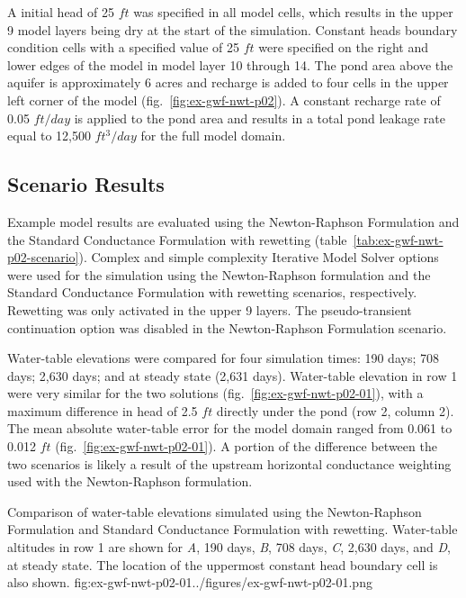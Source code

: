 A initial head of 25 $ft$ was specified in all model cells, which results in the upper 9 model layers being dry at the start of the simulation. Constant heads boundary condition cells with a specified value of 25 $ft$ were specified on the right and lower edges of the model in model layer 10 through 14. The pond area above the aquifer is approximately 6 acres and recharge is added to four cells in the upper left corner of the model (fig.~\ref{fig:ex-gwf-nwt-p02}). A constant recharge rate of 0.05 $ft/day$ is applied to the pond area and results in a total pond leakage rate equal to 12,500 $ft^3/day$ for the full model domain.


\subsection{Scenario Results}

Example model results are evaluated using the Newton-Raphson Formulation and the Standard Conductance Formulation with rewetting (table~\ref{tab:ex-gwf-nwt-p02-scenario}). Complex and simple complexity Iterative Model Solver options were used for the simulation using the Newton-Raphson formulation and the Standard Conductance Formulation with rewetting scenarios, respectively. Rewetting was only activated in the upper 9 layers. The pseudo-transient continuation option \citep{modflow6framework} was disabled in the Newton-Raphson Formulation scenario.

Water-table elevations were compared for four simulation times: 190 days; 708 days; 2,630 days; and at steady state (2,631 days). Water-table elevation in row 1 were very similar for the two solutions (fig.~\ref{fig:ex-gwf-nwt-p02-01}), with a maximum difference in head of 2.5 $ft$ directly under the pond (row 2, column 2). The mean absolute water-table error for the model domain ranged from 0.061 to 0.012 $ft$ (fig.~\ref{fig:ex-gwf-nwt-p02-01}). A portion of the difference between the two scenarios is likely a result of the upstream horizontal conductance weighting used with the Newton-Raphson formulation. 



\begin{StandardFigure}{
                                      Comparison of water-table elevations simulated using the Newton-Raphson
                                      Formulation and Standard Conductance Formulation with rewetting.
                                      Water-table altitudes in row 1 are shown for \textit{A}, 190 days, \textit{B}, 
                                      708 days, \textit{C}, 2,630 days, and \textit{D}, at steady state.
                                      The location of the uppermost constant head boundary cell is also shown.
                                     }{fig:ex-gwf-nwt-p02-01}{../figures/ex-gwf-nwt-p02-01.png}
\end{StandardFigure} 

